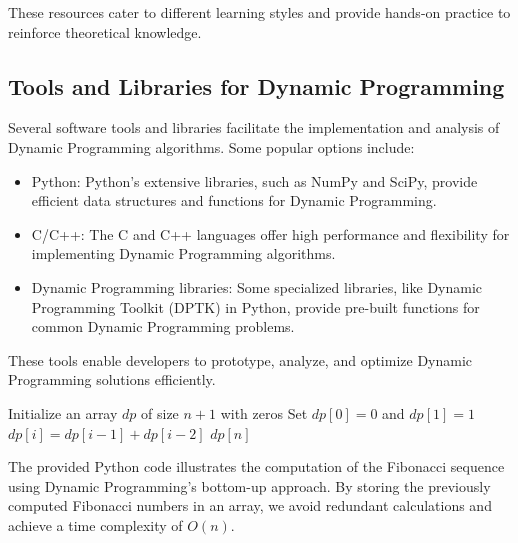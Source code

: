 \documentclass[12pt]{book} %
\begin{document}
These resources cater to different learning styles and provide hands-on practice to reinforce theoretical knowledge.

\subsection{Tools and Libraries for Dynamic Programming}
Several software tools and libraries facilitate the implementation and analysis of Dynamic Programming algorithms. Some popular options include:

\begin{itemize}
    \item Python: Python's extensive libraries, such as NumPy and SciPy, provide efficient data structures and functions for Dynamic Programming.
    \item C/C++: The C and C++ languages offer high performance and flexibility for implementing Dynamic Programming algorithms.
    \item Dynamic Programming libraries: Some specialized libraries, like Dynamic Programming Toolkit (DPTK) in Python, provide pre-built functions for common Dynamic Programming problems.
\end{itemize}

These tools enable developers to prototype, analyze, and optimize Dynamic Programming solutions efficiently.

\FloatBarrier
\begin{algorithm}[H]
\caption{Fibonacci Sequence using Dynamic Programming (Bottom-up approach)}
\begin{algorithmic}[1]
\State Initialize an array $dp$ of size $n+1$ with zeros
\State Set $dp[0] = 0$ and $dp[1] = 1$
    \State $dp[i] = dp[i-1] + dp[i-2]$
\EndFor
\Return $dp[n]$
\end{algorithmic}
\end{algorithm}
\FloatBarrier

The provided Python code illustrates the computation of the Fibonacci sequence using Dynamic Programming's bottom-up approach. By storing the previously computed Fibonacci numbers in an array, we avoid redundant calculations and achieve a time complexity of $O(n)$.
\end{document}
